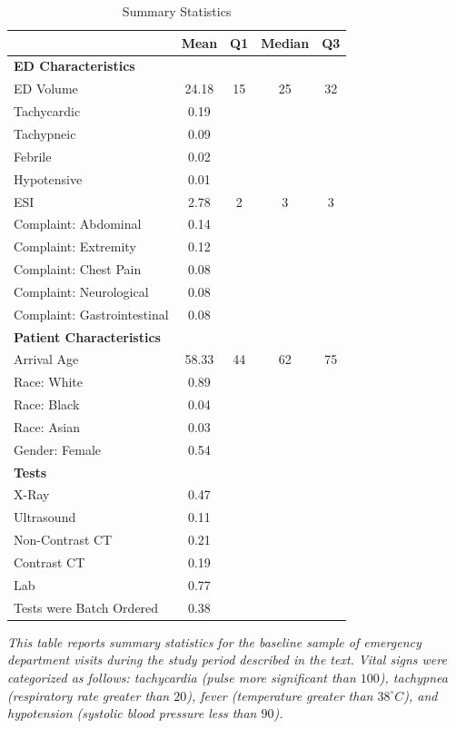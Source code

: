 \documentclass[,,nonblindrev]{informs}
\begin{document}
\begin{table}[ht]
\centering
\caption{Summary Statistics}
\label{tab:summary_statistics}
\begin{tabular}{p{10.5cm}cccc}
\toprule
\textbf{} & \textbf{Mean} & \textbf{Q1} & \textbf{Median} & \textbf{Q3} \\
\midrule
\multicolumn{5}{l}{\textbf{ED Characteristics}} \\
ED Volume & 24.18 & 15 & 25 & 32 \\
Tachycardic & 0.19 & & & \\
Tachypneic & 0.09 & & & \\
Febrile & 0.02 & & & \\
Hypotensive & 0.01 & & & \\ 
ESI & 2.78 & 2 & 3 & 3 \\
Complaint: Abdominal & 0.14 & & & \\
Complaint: Extremity & 0.12 & & & \\
Complaint: Chest Pain & 0.08 & & & \\
Complaint: Neurological & 0.08 & & & \\
Complaint: Gastrointestinal & 0.08 & & & \\
\midrule
\multicolumn{5}{l}{\textbf{Patient Characteristics}} \\
Arrival Age & 58.33 & 44 & 62 & 75 \\
Race: White & 0.89 & & & \\
Race: Black & 0.04 & & & \\
Race: Asian & 0.03 & & & \\
Gender: Female & 0.54 & & & \\
\midrule
\multicolumn{5}{l}{\textbf{Tests}} \\
X-Ray & 0.47 & & & \\
Ultrasound & 0.11 & & & \\
Non-Contrast CT & 0.21 & & & \\
Contrast CT & 0.19 & & & \\
Lab & 0.77 & & & \\
Tests were Batch Ordered & 0.38 & & & \\
\bottomrule
\end{tabular}
\begin{tablenotes}
\tiny
\item \textit{This table reports summary statistics for the baseline sample of emergency department visits during the study period described in the text. Vital signs were categorized as follows: tachycardia (pulse more significant than $100$), tachypnea (respiratory rate greater than $20$), fever (temperature greater than $38^\circ C$), and hypotension (systolic blood pressure less than $90$).}
\end{tablenotes}
\end{table}
\end{document}
